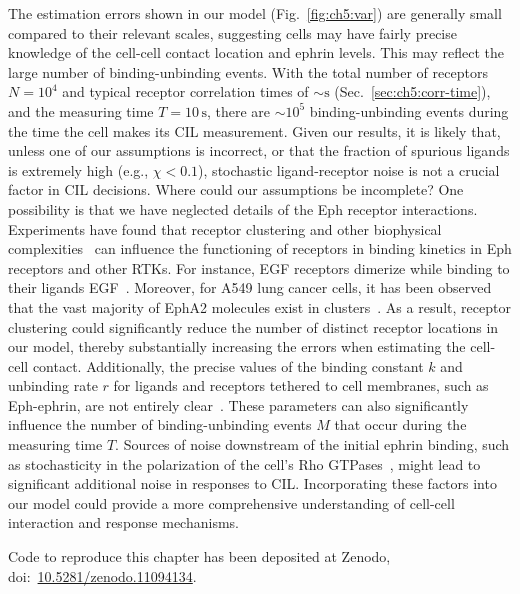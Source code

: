 The estimation errors shown in our model (Fig.~\ref{fig:ch5:var}) are generally small compared to their relevant scales, suggesting cells may have fairly precise knowledge of the cell-cell contact location and ephrin levels.
This may reflect the large number of binding-unbinding events.
With the total number of receptors $N=10^4$ and typical receptor correlation times of $\sim \mathrm{s}$ (Sec.~\ref{sec:ch5:corr-time}), and the measuring time $T=10\,\mathrm{s}$, there are $\sim 10^5$ binding-unbinding events during the time the cell makes its CIL measurement.
Given our results, it is likely that, unless one of our assumptions is incorrect, or that the fraction of spurious ligands is extremely high (e.g., $\chi < 0.1$), stochastic ligand-receptor noise is not a crucial factor in CIL decisions.
Where could our assumptions be incomplete?
One possibility is that we have neglected details of the Eph receptor interactions.
Experiments have found that receptor clustering and other biophysical complexities~\cite{zapata2022efficacy, macdonald2008heterogeneity, singh2018epha2, skoge2011dynamics} can influence the functioning of receptors in binding kinetics in Eph receptors and other RTKs.
For instance, EGF receptors dimerize while binding to their ligands EGF~\cite{macdonald2008heterogeneity}.
Moreover, for A549 lung cancer cells, it has been observed that the vast majority of EphA2 molecules exist in clusters~\cite{singh2018epha2}.
As a result, receptor clustering could significantly reduce the number of distinct receptor locations in our model, thereby substantially increasing the errors when estimating the cell-cell contact.
Additionally, the precise values of the binding constant $k$ and unbinding rate $r$ for ligands and receptors tethered to cell membranes, such as Eph-ephrin, are not entirely clear~\cite{bihr2014association, janes2022first, zarnitsyna2012t, bicknell2015limits}.
These parameters can also significantly influence the number of binding-unbinding events $M$ that occur during the measuring time $T$.
Sources of noise downstream of the initial ephrin binding, such as stochasticity in the polarization of the cell's Rho GTPases~\cite{walther2012deterministic, kulawiak2016modeling, copos2020hybrid, perez2024deposited}, might lead to significant additional noise in responses to CIL.
Incorporating these factors into our model could provide a more comprehensive understanding of cell-cell interaction and response mechanisms.

Code to reproduce this chapter has been deposited at Zenodo, doi:~\href{https://doi.org/10.5281/zenodo.11094134}{10.5281/zenodo.11094134}.



